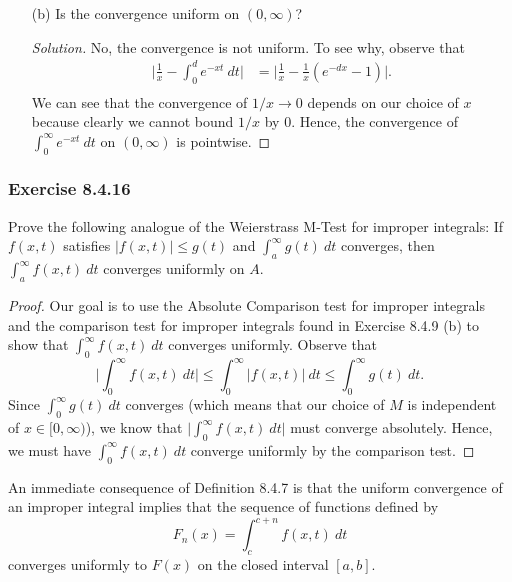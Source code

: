 \begin{enumerate}
\begin{proof}
        \end{proof}
    \item[(b)] Is the convergence uniform on \( (0,\infty ) \)? 
        \begin{proof}[Solution]
        No, the convergence is not uniform. To see why, observe that 
        \begin{align*}
           \Big| \frac{ 1 }{ x } - \int_{ 0 }^{ d } e^{-xt} \ dt \Big|  &= \Big| \frac{ 1 }{ x } - \frac{ 1 }{ x }  ( e^{-dx} - 1) \Big|.  \\
        \end{align*}
        We can see that the convergence of \( 1 /x \to 0   \) depends on our choice of \( x  \) because clearly we cannot bound \( 1/ x  \) by \( 0  \). Hence, the convergence of \( \int_{ 0 }^{ \infty  }  e^{-xt}  \ dt \) on \( (0,\infty )  \) is pointwise.  
        \end{proof}
\end{enumerate}

\subsubsection{Exercise 8.4.16} Prove the following analogue of the Weierstrass M-Test for improper integrals: If \( f(x,t)  \) satisfies \( | f(x,t)  | \leq g(t)  \) and \( \int_{ a }^{ \infty  } g(t) \ dt \) converges, then \( \int_{ a }^{ \infty  } f(x,t) \ dt \) converges uniformly on \( A  \).

\begin{proof}
Our goal is to use the Absolute Comparison test for improper integrals and the comparison test for improper integrals found in Exercise 8.4.9 (b) to show that \( \int_{ 0 }^{ \infty  } f(x,t) \ dt  \) converges uniformly. Observe that 
\[  \Big| \int_{ 0 }^{ \infty  }  f(x,t) \  dt  \Big| \leq \int_{ 0 }^{ \infty  }  | f(x,t)  | \ dt \leq \int_{ 0 }^{ \infty  }  g(t) \ dt. \]
Since \( \int_{ 0 }^{ \infty  } g(t) \ dt  \) converges (which means that our choice of \( M  \) is independent of \( x \in [0, \infty ) \)), we know that \( \Big| \int_{ 0 }^{ \infty  } f(x,t) \ dt \Big|  \) must converge absolutely. Hence, we must have \( \int_{ 0 }^{ \infty  }  f(x,t)  \ dt  \) converge uniformly by the comparison test.
\end{proof}

An immediate consequence of Definition 8.4.7 is that the uniform convergence of an improper integral implies that the sequence of functions defined by 
\[  F_{n}(x) = \int_{ c }^{ c + n  } f(x,t) \ dt  \] converges uniformly to \( F(x)  \) on the closed interval \( [a,b] \). 


